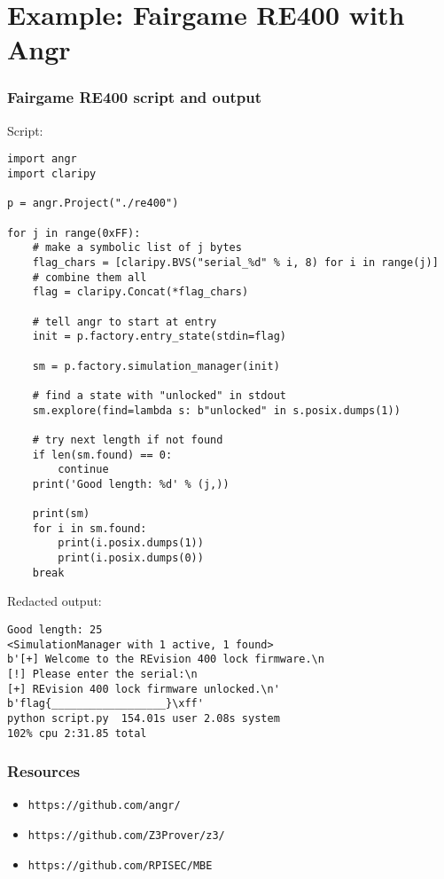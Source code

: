 \documentclass[aspectratio=169]{beamer}
\begin{document}
\section{Example: Fairgame RE400 with Angr}
\begin{frame}[fragile]
\frametitle{Fairgame RE400 script and output}
\begin{minipage}{0.55\textwidth}
Script:
\begin{Verbatim}[frame=single, fontsize=\tiny]
import angr
import claripy

p = angr.Project("./re400")

for j in range(0xFF):
    # make a symbolic list of j bytes
    flag_chars = [claripy.BVS("serial_%d" % i, 8) for i in range(j)]
    # combine them all
    flag = claripy.Concat(*flag_chars)

    # tell angr to start at entry
    init = p.factory.entry_state(stdin=flag)

    sm = p.factory.simulation_manager(init)

    # find a state with "unlocked" in stdout
    sm.explore(find=lambda s: b"unlocked" in s.posix.dumps(1))

    # try next length if not found
    if len(sm.found) == 0:
        continue
    print('Good length: %d' % (j,))

    print(sm)
    for i in sm.found:
        print(i.posix.dumps(1))
        print(i.posix.dumps(0))
    break
\end{Verbatim}
\end{minipage}
\begin{minipage}{0.44\textwidth}
Redacted output:
\begin{Verbatim}[frame=single, fontsize=\tiny]
Good length: 25
<SimulationManager with 1 active, 1 found>
b'[+] Welcome to the REvision 400 lock firmware.\n
[!] Please enter the serial:\n
[+] REvision 400 lock firmware unlocked.\n'
b'flag{__________________}\xff'
python script.py  154.01s user 2.08s system
102% cpu 2:31.85 total
\end{Verbatim}
\end{minipage}
\end{frame}

\begin{frame}[fragile]
\frametitle{Resources}
\begin{itemize}
\item \verb|https://github.com/angr/|
\item \verb|https://github.com/Z3Prover/z3/|
\item \verb|https://github.com/RPISEC/MBE|
\end{itemize}
\end{frame}
\end{document}
